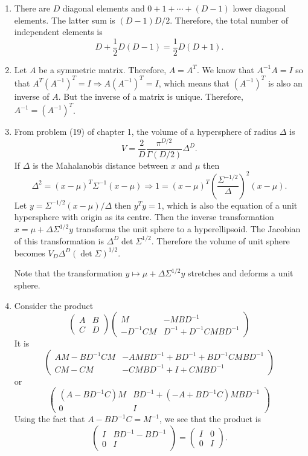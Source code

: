 \begin{enumerate}
\item There are $D$ diagonal elements and $0 + 1 + \cdots + (D - 1)$ lower diagonal elements. The
latter sum is $(D - 1)D/2$. Therefore, the total number of independent elements is
\[
D + \frac{1}{2}D(D - 1) = \frac{1}{2}D(D + 1).
\]

\item Let $A$ be a symmetric matrix. Therefore, $A = A^T$. We know that $A^{-1}A = I$ so that
$A^T(A^{-1})^T = I \Rightarrow A (A^{-1})^T = I$, which means that $(A^{-1})^T$ is also an inverse
of $A$. But the inverse of a matrix is unique. Therefore, $A^{-1} = (A^{-1})^T$.

\item From problem (19) of chapter 1, the volume of a hypersphere of radius $\Delta$ is
\[
V = \frac{2}{D}\frac{\pi^{D/2}}{\Gamma(D/2)}\Delta^D.
\]
If $\Delta$ is the Mahalanobis distance between $x$ and $\mu$ then
\[
\Delta^2 = (x - \mu)^T\Sigma^{-1}(x - \mu) \Rightarrow 1 = (x - \mu)^T\left(\frac{\Sigma^{-1/2}}{\Delta}\right)^2(x - \mu).
\]
Let $y = \Sigma^{-1/2}(x - \mu)/\Delta$ then $y^Ty = 1$, which is also the equation of a
unit hypersphere with origin as its centre. Then the inverse transformation $x = \mu + \Delta\Sigma^{1/2}y$
transforms the unit sphere to a hyperellipsoid. The Jacobian of this transformation is $\Delta^D\det\Sigma^{1/2}$.
Therefore the volume of unit sphere becomes $V_D\Delta^D(\det\Sigma)^{1/2}$. 

Note that the transformation $y \mapsto \mu + \Delta\Sigma^{1/2}y$ stretches and deforms a
unit sphere.

\item Consider the product
\[
\begin{pmatrix} A & B \\ C & D\end{pmatrix}\begin{pmatrix} M & -MBD^{-1} \\ -D^{-1}CM & D^{-1}+D^{-1}CMBD^{-1}\end{pmatrix}
\]
It is
\[
\begin{pmatrix}
AM - BD^{-1}CM & -AMBD^{-1} + BD^{-1} + BD^{-1}CMBD^{-1} \\ 
CM -CM & -CMBD^{-1} + I + CMBD^{-1}
\end{pmatrix}
\]
or
\[
\begin{pmatrix}
(A - BD^{-1}C)M & BD^{-1} + (-A+BD^{-1}C)MBD^{-1} \\
0 & I
\end{pmatrix}
\]
Using the fact that $A - BD^{-1}C = M^{-1}$, we see that the product is
\[
\begin{pmatrix}I & BD^{-1} - BD^{-1} \\ 0 & I \end{pmatrix} = \begin{pmatrix}I&0\\0&I\end{pmatrix}.
\]


\end{enumerate}
